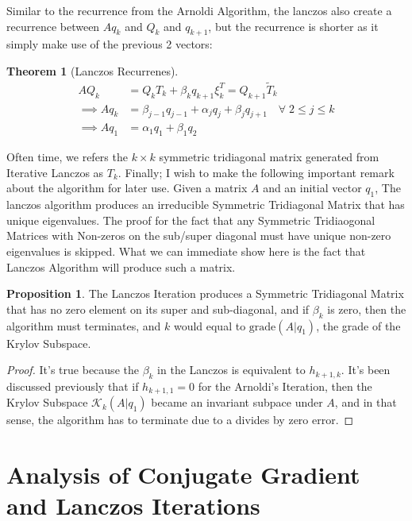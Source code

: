 \documentclass[]{article}
\theoremstyle{definition}
\newtheorem{theorem}{Theorem}            %
\newtheorem{prop}{Proposition}[section]  %
\begin{document}
            Similar to the recurrence from the Arnoldi Algorithm, the lanczos also create a recurrence between $Aq_k$ and $Q_k$ and $q_{k + 1}$, but the recurrence is shorter as it simply make use of the previous 2 vectors: 
            \begin{theorem}[Lanczos Recurrenes]
                \begin{align}
                    AQ_k &= Q_kT_k + \beta_k q_{k + 1}\xi_k^T = Q_{k + 1}\tilde{T}_k
                    \\
                    \implies Aq_k
                    &= \beta_{j - 1}q_{j - 1} + \alpha_j q_j + \beta_{j}q_{j + 1} \quad \forall\; 2\le j\le k
                    \\
                    \implies Aq_1 &= \alpha_1q_1 + \beta_1 q_2
                \end{align}    
            \end{theorem}
            
            \par
            Often time, we refers the $k\times k$ symmetric tridiagonal matrix generated from Iterative Lanczos as $T_k$. Finally; I wish to make the following important remark about the algorithm for later use. Given a matrix $A$ and an initial vector $q_1$, The lanczos algorithm produces an irreducible Symmetric Tridiagonal Matrix that has unique eigenvalues. The proof for the fact that any Symmetric Tridiaogonal Matrices with Non-zeros on the sub/super diagonal must have unique non-zero eigenvalues is skipped. What we can immediate show here is the fact that Lanczos Algorithm will produce such a matrix. 
            \begin{prop}
                The Lanczos Iteration produces a Symmetric Tridiagonal Matrix that has no zero element on its super and sub-diagonal, and if $\beta_k$ is zero, then the algorithm must terminates, and $k$ would equal to $\text{grade}(A|q_1)$, the grade of the Krylov Subspace. 
            \end{prop}
            \begin{proof}
                It's true because the $\beta_{k}$ in the Lanczos is equivalent to $h_{k + 1, k}$. It's been discussed previously that if $h_{k + 1, 1} = 0$ for the Arnoldi's Iteration, then the Krylov Subspace $\mathcal K_k(A|q_1)$ became an invariant subpace under $A$, and in that sense, the algorithm has to terminate due to a divides by zero error. 
            \end{proof}
\section{Analysis of Conjugate Gradient and Lanczos Iterations}
\end{document}
